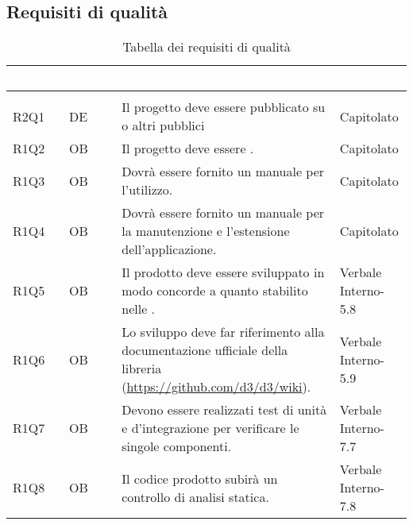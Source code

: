 \subsection{Requisiti di qualità}
{
\setlength\arrayrulewidth{1pt}
\begin{longtable}{C{2cm} | C{1.5cm} | C{9cm} | C{3.3cm}}
		\textcolor{white}{\textbf{Codice}} & 
		\textcolor{white}{\textbf{Classe}} & 
		\textcolor{white}{\textbf{Descrizione}} & 
		\textcolor{white}{\textbf{Fonti}} \\
		\endfirsthead
	    \\
	    \endfoot
	    \caption{Tabella dei requisiti di qualità}
	    \endlastfoot

R2Q1 & DE & Il progetto deve essere pubblicato su  o altri  pubblici & Capitolato \\
R1Q2 & OB & Il progetto deve essere . & Capitolato\\
R1Q3 & OB & Dovrà essere fornito un manuale per l'utilizzo. & Capitolato\\
R1Q4 & OB & Dovrà essere fornito un manuale per la manutenzione e l'estensione dell'applicazione. & Capitolato\\
R1Q5 & OB & Il prodotto deve essere sviluppato in modo concorde a quanto stabilito nelle \NdPv{}. & Verbale Interno-5.8\\
R1Q6 & OB & Lo sviluppo deve far riferimento alla documentazione ufficiale della libreria (\textcolor{blue}{\url{https://github.com/d3/d3/wiki}}). & Verbale Interno-5.9 \\
R1Q7 & OB & Devono essere realizzati test di unità e d'integrazione per verificare le singole componenti. & Verbale Interno-7.7\\
R1Q8 & OB & Il codice prodotto subirà un controllo di analisi statica.  & Verbale Interno-7.8\\

\end{longtable}
}